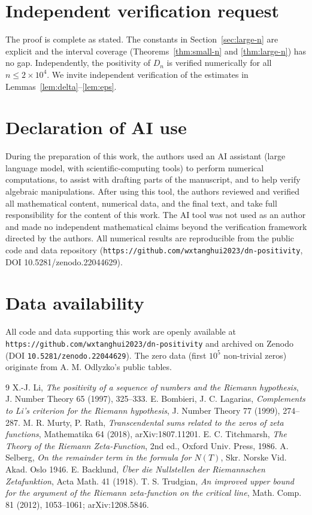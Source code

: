 \documentclass[11pt]{article}
\begin{document}
\section*{Independent verification request}
\label{sec:verify}

The proof is complete as stated. The constants in Section~\ref{sec:large-n} are explicit
and the interval coverage (Theorems~\ref{thm:small-n} and \ref{thm:large-n}) has no gap.
Independently, the positivity of $D_n$ is verified numerically for all $n\le2\times10^4$.
We invite independent verification of the estimates in Lemmas~\ref{lem:delta}--\ref{lem:eps}.

\section*{Declaration of AI use}
\label{sec:ai}

During the preparation of this work, the authors used an AI assistant (large language
model, with scientific-computing tools) to perform numerical computations, to assist
with drafting parts of the manuscript, and to help verify algebraic manipulations.
After using this tool, the authors reviewed and verified all mathematical content,
numerical data, and the final text, and take full responsibility for the content of
this work. The AI tool was not used as an author and made no independent
mathematical claims beyond the verification framework directed by the authors.
All numerical results are reproducible from the public code and data repository
(\texttt{https://github.com/wxtanghui2023/dn-positivity}, DOI 10.5281/zenodo.22044629).

\section*{Data availability}

All code and data supporting this work are openly available at
\texttt{https://github.com/wxtanghui2023/dn-positivity} and archived on Zenodo
(DOI \texttt{10.5281/zenodo.22044629}). The zero data (first $10^5$ non-trivial zeros)
originate from A. M. Odlyzko's public tables.

\begin{thebibliography}{9}
 X.-J. Li, \emph{The positivity of a sequence of numbers and the Riemann
hypothesis}, J. Number Theory 65 (1997), 325--333.
 E. Bombieri, J. C. Lagarias, \emph{Complements to Li's criterion for the
Riemann hypothesis}, J. Number Theory 77 (1999), 274--287.
 M. R. Murty, P. Rath, \emph{Transcendental sums related to the zeros of
zeta functions}, Mathematika 64 (2018), arXiv:1807.11201.
 E. C. Titchmarsh, \emph{The Theory of the Riemann Zeta-Function}, 2nd
ed., Oxford Univ. Press, 1986.
 A. Selberg, \emph{On the remainder term in the formula for $N(T)$},
Skr. Norske Vid. Akad. Oslo 1946.
 E. Backlund, \emph{Über die Nullstellen der Riemannschen
Zetafunktion}, Acta Math. 41 (1918).
 T. S. Trudgian, \emph{An improved upper bound for the argument of the
Riemann zeta-function on the critical line}, Math. Comp. 81 (2012), 1053--1061; arXiv:1208.5846.
\end{thebibliography}
\end{document}
